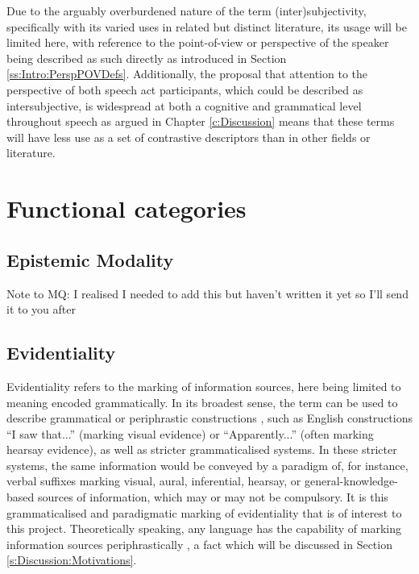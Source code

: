 Due to the arguably overburdened nature of the term (inter)subjectivity, specifically with its varied uses in related but distinct literature, its usage will be limited here, with reference to the point-of-view or perspective of the speaker being described as such directly as introduced in Section \ref{ss:Intro:PerspPOVDefs}. Additionally, the proposal that attention to the perspective of both speech act participants, which could be described as intersubjective, is widespread at both a cognitive and grammatical level throughout speech as argued in Chapter \ref{c:Discussion} means that these terms will have less use as a set of contrastive descriptors than in other fields or literature.

\section{Functional categories}\label{s:Intro:Categories}
\subsection{Epistemic Modality}
Note to MQ: I realised I needed to add this but haven't written it yet so I'll send it to you after

\subsection{Evidentiality}\label{s:Intro:EvidentialityIntro}
Evidentiality refers to the marking of information sources, here being limited to meaning encoded grammatically. In its broadest sense, the term can be used to describe grammatical or periphrastic constructions \cite{SanRoque2019Evidentiality}, such as English constructions ``I saw that...'' (marking visual evidence) or ``Apparently...'' (often marking hearsay evidence), as well as stricter grammaticalised systems. In these stricter systems, the same information would be conveyed by a paradigm of, for instance, verbal suffixes marking visual, aural, inferential, hearsay, or general-knowledge-based sources of information, which may or may not be compulsory. It is this grammaticalised and paradigmatic marking of evidentiality that is of interest to this project. Theoretically speaking, any language has the capability of marking information sources periphrastically \cite{SanRoque2019Evidentiality}, a fact which will be discussed in Section \ref{s:Discussion:Motivations}.

